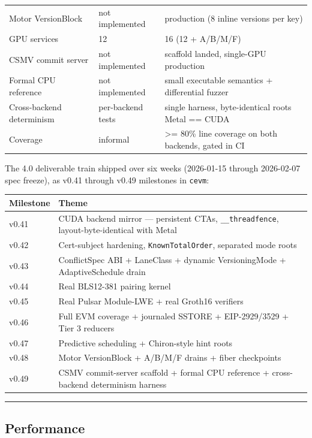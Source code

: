 \documentclass[
]{article}
\newcounter{none} %
\begin{document}
{\begin{longtable}[]{@{}lll@{}}
Motor VersionBlock & not implemented & production (8 inline versions per
key) \\
GPU services & 12 & 16 (12 + A/B/M/F) \\
CSMV commit server & not implemented & scaffold landed, single-GPU
production \\
Formal CPU reference & not implemented & small executable semantics +
differential fuzzer \\
Cross-backend determinism & per-backend tests & single harness,
byte-identical roots Metal == CUDA \\
Coverage & informal & \textgreater= 80\% line coverage on both backends,
gated in CI \\
\end{longtable}
}

The 4.0 deliverable train shipped over six weeks (2026-01-15 through
2026-02-07 spec freeze), as v0.41 through v0.49 milestones in
\texttt{cevm}:

{\def\LTcaptype{none} %
\begin{longtable}[]{@{}ll@{}}
\toprule\noalign{}
Milestone & Theme \\
\midrule\noalign{}
\endhead
\bottomrule\noalign{}
\endlastfoot
v0.41 & CUDA backend mirror --- persistent CTAs,
\texttt{\_\_threadfence}, layout-byte-identical with Metal \\
v0.42 & Cert-subject hardening, \texttt{KnownTotalOrder}, separated mode
roots \\
v0.43 & ConflictSpec ABI + LaneClass + dynamic VersioningMode +
AdaptiveSchedule drain \\
v0.44 & Real BLS12-381 pairing kernel \\
v0.45 & Real Pulsar Module-LWE + real Groth16 verifiers \\
v0.46 & Full EVM coverage + journaled SSTORE + EIP-2929/3529 + Tier 3
reducers \\
v0.47 & Predictive scheduling + Chiron-style hint roots \\
v0.48 & Motor VersionBlock + A/B/M/F drains + fiber checkpoints \\
v0.49 & CSMV commit-server scaffold + formal CPU reference +
cross-backend determinism harness \\
\end{longtable}
}

\begin{center}\rule{0.5\linewidth}{0.5pt}\end{center}

\subsection{Performance}\label{performance}
\end{document}
